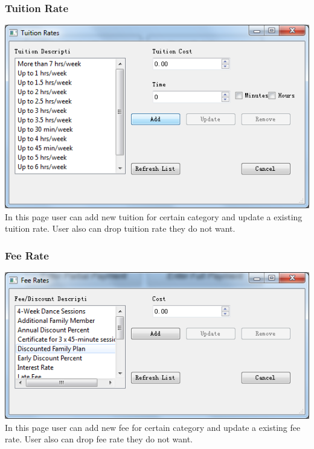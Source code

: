 \subsubsection{Tuition Rate}
\includegraphics[scale=0.5]{pics/Tuition_rate.png}\\
In this page user can add new tuition for certain category and update a existing tuition rate. User also can drop tuition rate they do not want.

\subsubsection{Fee Rate}
\includegraphics[scale=0.5]{pics/Fee_rate.png}\\
In this page user can add new fee for certain category and update a existing fee rate. User also can drop fee rate they do not want.

